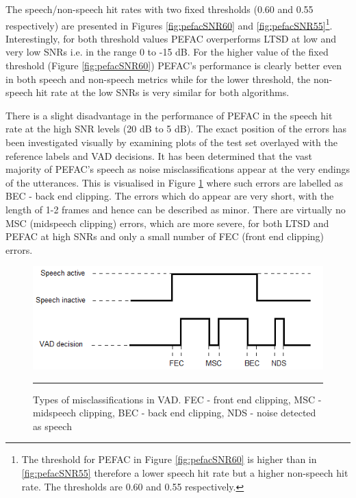 The speech/non-speech hit rates with two fixed thresholds (0.60 and 0.55 respectively) are presented in Figures \ref{fig:pefacSNR60} and \ref{fig:pefacSNR55}\footnote{The threshold for PEFAC in Figure \ref{fig:pefacSNR60} is higher than in \ref{fig:pefacSNR55} therefore a lower speech hit rate but a higher non-speech hit rate. The thresholds are 0.60 and 0.55 respectively.}. Interestingly, for both threshold values PEFAC overperforms LTSD at low and very low SNRs i.e. in the range 0 to -15 dB. For the higher value of the fixed threshold (Figure \ref{fig:pefacSNR60}) PEFAC's performance is clearly better even in both speech and non-speech metrics while for the lower threshold, the non-speech hit rate at the low SNRs is very similar for both algorithms.

There is a slight disadvantage in the performance of PEFAC in the speech hit rate at the high SNR levels (20 dB to 5 dB). The exact position of the errors has been investigated visually by examining plots of the test set overlayed with the reference labels and VAD decisions. It has been determined that the vast majority of PEFAC's speech as noise misclassifications appear at the very endings of the utterances. This is visualised in Figure \ref{fig:clipping} where such errors are labelled as BEC - back end clipping. The errors which do appear are very short, with the length of 1-2 frames and hence can be described as minor. There are virtually no MSC (midspeech clipping) errors, which are more severe, for both LTSD and PEFAC at high SNRs and only a small number of FEC (front end clipping) errors.

\begin{figure}[htbp]
	\centering
		\includegraphics[width=1.0\columnwidth]{Figures/Chapter5/clipping.png}
		\rule{37em}{0.5pt}
	\caption[Types of misclassifications in VAD]{Types of misclassifications in VAD. FEC - front end clipping, MSC - midspeech clipping, BEC - back end clipping, NDS - noise detected as speech}
	\label{fig:clipping}
\end{figure}

